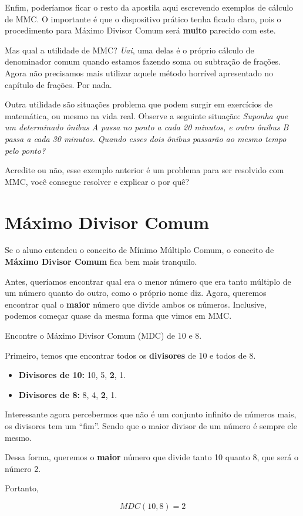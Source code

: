 Enfim, poderíamos ficar o resto da apostila aqui escrevendo exemplos de cálculo de MMC. O importante é que o dispositivo prático tenha ficado claro, pois o procedimento para Máximo Divisor Comum será \textbf{muito} parecido com este.

Mas qual a utilidade de MMC? \textit{Uai}, uma delas é o próprio cálculo de denominador comum quando estamos fazendo soma ou subtração de frações. Agora não precisamos mais utilizar aquele método horrível apresentado no capítulo de frações. Por nada.

Outra utilidade são situações problema que podem surgir em exercícios de matemática, ou mesmo na vida real. Observe a seguinte situação: \textit{Suponha que um determinado ônibus A passa no ponto a cada 20 minutos, e outro ônibus B passa a cada 30 minutos. Quando esses dois ônibus passarão ao mesmo tempo pelo ponto?}

Acredite ou não, esse exemplo anterior é um problema para ser resolvido com MMC, você consegue resolver e explicar o por quê?

\newpage

\section{Máximo Divisor Comum}

Se o aluno entendeu o conceito de Mínimo Múltiplo Comum, o conceito de \textbf{Máximo Divisor Comum} fica bem mais tranquilo. 

Antes, queríamos encontrar qual era o menor número que era tanto múltiplo de um número quanto do outro, como o próprio nome diz. Agora, queremos encontrar qual o \textbf{maior} número que divide ambos os números. Inclusive, podemos começar quase da mesma forma que vimos em MMC.

\begin{exemplo}
    Encontre o Máximo Divisor Comum (MDC) de 10 e 8.

    Primeiro, temos que encontrar todos os \textbf{divisores} de 10 e todos de 8.

    \begin{itemize}
        \item \textbf{Divisores de 10:} 10, 5, \textbf{2}, 1.
        \item \textbf{Divisores de 8:} 8, 4, \textbf{2}, 1.
    \end{itemize}

    Interessante agora percebermos que não é um conjunto infinito de números mais, os divisores tem um ``fim''. Sendo que o maior divisor de um número é sempre ele mesmo.

    Dessa forma, queremos o \textbf{maior} número que divide tanto 10 quanto 8, que será o número 2.

    Portanto, 

    \begin{equation}
        MDC(10,8)=2
    \end{equation}
\end{exemplo}

